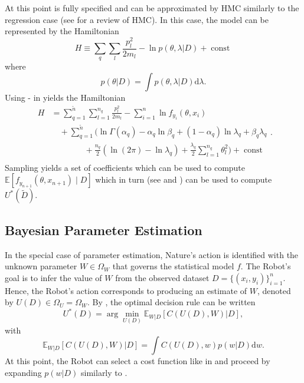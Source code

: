 At this point  is fully specified and can be approximated by HMC similarly to the regression case (see  for a review of HMC). In this case, the model can be represented by the Hamiltonian 
\begin{equation}
	H \equiv  \sum_{q}\sum_{l}\frac{p_{l}^2}{2m_{l}}-\ln p(\theta,\lambda|D)+\operatorname{const}
	\label{ham3}
\end{equation}
where
\begin{equation}
	p(\theta|D) = \int p(\theta,\lambda|D) \mathrm{d} \lambda.
\end{equation}
Using - in  yields the Hamiltonian
\begin{equation}
	\begin{split}
		H&=\sum_{q=1}^{\tilde{n}}\sum_{l=1}^{n_q}\frac{p_{l}^2}{2m_{l}}-\sum_{i=1}^{n}\ln f_{y_i}(\theta,x_i)\\
		&\quad+\sum_{q=1}^{\tilde{n}}\bigg(\ln\Gamma(\alpha_q)-\alpha_q\ln\beta_q+(1-\alpha_q)\ln\lambda_q+\beta_q\lambda_q\\
		&\qquad \qquad+\frac{n_q}{2}(\ln(2\pi)-\ln\lambda_q)+\frac{\lambda_q}{2}\sum_{l=1}^{n_q}\theta_l^2\bigg)+\operatorname{const}\\
	\end{split}.
	\label{ham2}
\end{equation}
Sampling  yields a set of coefficients which can be used to compute $\mathbb{E}[f_{y_{n+1}}(\theta,x_{n+1})\mid D]$ which in turn (see  and ) can be used to compute $U^*(\tilde{D})$.


\subsection{Bayesian Parameter Estimation}
In the special case of parameter estimation, Nature’s action is identified with the unknown parameter $W \in \Omega_W$ that governs the statistical model $f$. The Robot’s goal is to infer the value of $W$ from the observed dataset $D = \{(x_i, y_i)\}_{i=1}^n$. Hence, the Robot’s action corresponds to producing an estimate of $W$, denoted by $U(D) \in \Omega_U = \Omega_W$. By , the optimal decision rule can be written
\begin{equation}
	U^*(D)=\arg\min_{U(D)}\mathbb{E}_{W|D}[C(U(D), W)|D],
\end{equation}
with
\begin{equation}
	\mathbb{E}_{W|D}[C(U(D), W)|D] = \int C(U(D),w)p(w|D) \mathrm{d}w.
\end{equation}
At this point, the Robot can select a cost function like in  and proceed by expanding $p(w|D)$ similarly to .

